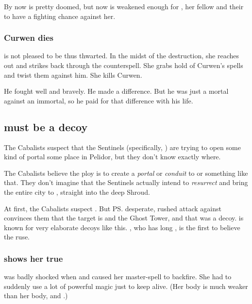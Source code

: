 By now \Forclin{} is pretty doomed, but now \Nzessuacrith{} is weakened enough for \Achsah{}, her fellow \resphain{} and their  to have a fighting chance against her. 





\subsubsection{Curwen dies}
\Takestsha is not pleased to be thus thwarted. 
In the midst of the destruction, she reaches out and strikes back through the counterspell.
She grabs hold of Curwen's spells and twist them against him.
She kills Curwen.

He fought well and bravely.
He made a difference.
But he was just a mortal against an immortal, so he paid for that difference with his life. 









\subsection{\Malcur must be a decoy}
The Cabalists suspect that the Sentinels (specifically, \Secherdamon) are trying to open some kind of portal some place in Pelidor, but they don't know exactly where. 

The Cabalists believe the ploy is to create a \emph{portal} or \emph{conduit} to \Nithdornazsh{} or something like that. 
They don't imagine that the Sentinels actually intend to \emph{resurrect} \Nithdornazsh{} and bring the entire city to \Azmith, straight into the deep Shroud. 

At first, the Cabalists suspect \Malcur. 
But \ps{\Takestsha} desperate, rushed attack against \Forclin{} convinces them that the target is \Forclin{} and the Ghost Tower, and that \Malcur was a decoy. 
\Secherdamon{} is known for very elaborate decoys like this. 
\Achsah, who has long , is the first to believe the \Forclin{} ruse. 





\subsubsection{\Nzessuacrith shows her true \colours}
\Takestsha was badly shocked when  and caused her \quo{\EreshKali} master-spell to backfire. 
She had to suddenly use a lot of powerful magic just to keep alive. 
(Her \human body is much weaker than her \draconian body, and .) 

